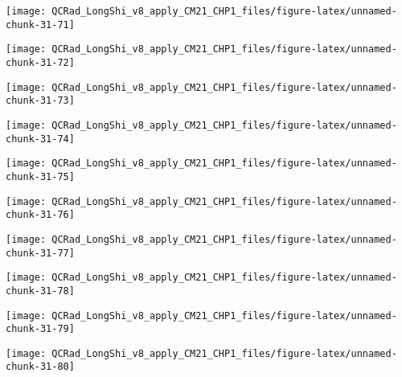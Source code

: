\documentclass[
  10pt,
  a4paper,oneside]{article}
\begin{document}
\begin{center}\texttt{[image: QCRad\_LongShi\_v8\_apply\_CM21\_CHP1\_files/figure-latex/unnamed-chunk-31-71]} \end{center}

\begin{center}\texttt{[image: QCRad\_LongShi\_v8\_apply\_CM21\_CHP1\_files/figure-latex/unnamed-chunk-31-72]} \end{center}

\begin{center}\texttt{[image: QCRad\_LongShi\_v8\_apply\_CM21\_CHP1\_files/figure-latex/unnamed-chunk-31-73]} \end{center}

\begin{center}\texttt{[image: QCRad\_LongShi\_v8\_apply\_CM21\_CHP1\_files/figure-latex/unnamed-chunk-31-74]} \end{center}

\begin{center}\texttt{[image: QCRad\_LongShi\_v8\_apply\_CM21\_CHP1\_files/figure-latex/unnamed-chunk-31-75]} \end{center}

\begin{center}\texttt{[image: QCRad\_LongShi\_v8\_apply\_CM21\_CHP1\_files/figure-latex/unnamed-chunk-31-76]} \end{center}

\begin{center}\texttt{[image: QCRad\_LongShi\_v8\_apply\_CM21\_CHP1\_files/figure-latex/unnamed-chunk-31-77]} \end{center}

\begin{center}\texttt{[image: QCRad\_LongShi\_v8\_apply\_CM21\_CHP1\_files/figure-latex/unnamed-chunk-31-78]} \end{center}

\begin{center}\texttt{[image: QCRad\_LongShi\_v8\_apply\_CM21\_CHP1\_files/figure-latex/unnamed-chunk-31-79]} \end{center}

\begin{center}\texttt{[image: QCRad\_LongShi\_v8\_apply\_CM21\_CHP1\_files/figure-latex/unnamed-chunk-31-80]} \end{center}
\end{document}
